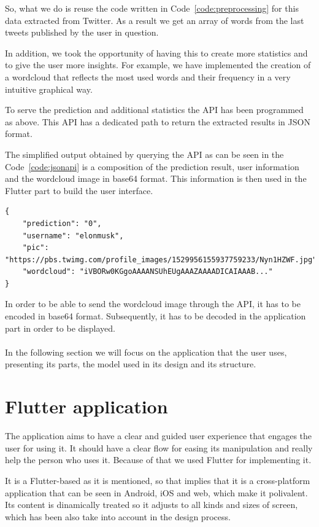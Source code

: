 So, what we do is reuse the code written in Code~\ref{code:preprocessing} for this data extracted from Twitter. As a result we get an array of words from the last tweets published by the user in question.

In addition, we took the opportunity of having this to create more statistics and to give the user more insights. For example, we have implemented the creation of a wordcloud that reflects the most used words and their frequency in a very intuitive graphical way.

To serve the prediction and additional statistics the API has been programmed as above. This API has a dedicated path to return the extracted results in JSON format.

The simplified output obtained by querying the API as can be seen in the Code~\ref{code:jsonapi} is a composition of the prediction result, user information and the wordcloud image in base64 format. This information is then used in the Flutter part to build the user interface.

\begin{lstlisting}[caption={JSON output from API}, label={code:jsonapi}]
{
    "prediction": "0", 
    "username": "elonmusk", 
    "pic": "https://pbs.twimg.com/profile_images/1529956155937759233/Nyn1HZWF.jpg", 
    "wordcloud": "iVBORw0KGgoAAAANSUhEUgAAAZAAAADICAIAAAB..."
}
\end{lstlisting}


In order to be able to send the wordcloud image through the API, it has to be encoded in base64 format. Subsequently, it has to be decoded in the application part in order to be displayed.\\\\
In the following section we will focus on the application that the user uses, presenting its parts, the model used in its design and its structure.
\section{Flutter application}
The application aims to have a clear and guided user experience that engages the user for using it. It should have a clear flow for easing its manipulation and really help the person who uses it. Because of that we used Flutter for implementing it.

It is a Flutter-based as it is mentioned, so that implies that it is a cross-platform application that can be seen in Android, iOS and web, which make it polivalent. Its content is dinamically treated so it adjusts to all kinds and sizes of screen, which has been also take into account in the design process.

